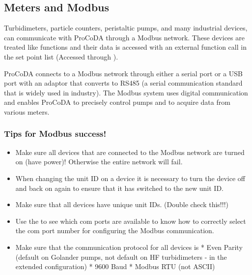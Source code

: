 \documentclass[letterpaper,10pt,english]{sphinxmanual}
\begin{document}
\subsection{Meters and Modbus}
\label{\detokenize{ProCoDA/ProCoDA:meters-and-modbus}}\label{\detokenize{ProCoDA/ProCoDA:heading-procoda-meters}}
Turbidimeters, particle counters, peristaltic pumps, and many industrial devices, can communicate with ProCoDA through a Modbus network. These devices are treated like functions and their data is accessed with an external function call in the set point list (Accessed through ).

ProCoDA connects to a Modbus network through either a serial port or a USB port with an adaptor that converts to RS485 (a serial communication standard that is widely used in industry). The Modbus system uses digital communication and enables ProCoDA to precisely control pumps and to acquire data from various meters.


\subsubsection{Tips for Modbus success!}
\label{\detokenize{ProCoDA/ProCoDA:tips-for-modbus-success}}\begin{itemize}
\item {} 
Make sure all devices that are connected to the Modbus network are turned on (have power)! Otherwise the entire network will fail.

\item {} 
When changing the unit ID on a device it is necessary to turn the device off and back on again to ensure that it has switched to the new unit ID.

\item {} 
Make sure that all devices have unique unit IDs. (Double check this!!!)

\item {} 
Use the  to see which com ports are available to know how to correctly select the com port number for configuring the Modbus communication.

\item {} 
Make sure that the communication protocol for all devices is
* Even Parity (default on Golander pumps, not default on HF turbidimeters - in the extended configuration)
* 9600 Baud
* Modbus RTU (not ASCII)

\end{itemize}
\end{document}
